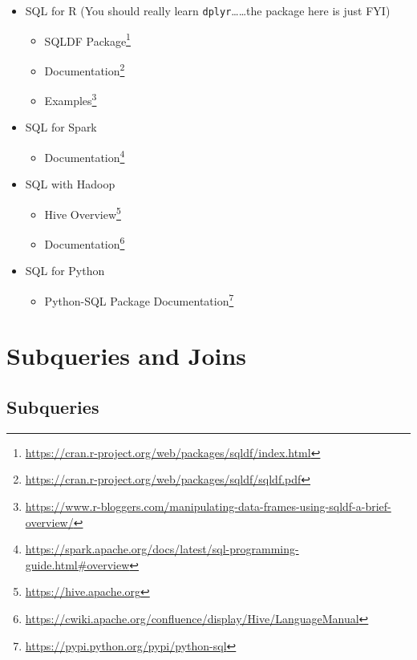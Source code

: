 \documentclass[]{book}
\providecommand{\tightlist}{%
  \setlength{\itemsep}{0pt}\setlength{\parskip}{0pt}}
\renewcommand{\href}[2]{#2\footnote{\url{#1}}}
\theoremstyle{definition}
\theoremstyle{definition}
\theoremstyle{remark}
\begin{document}
\begin{itemize}
\tightlist
\item
  SQL for R (You should really learn \texttt{dplyr}\ldots{}\ldots{}the
  package here is just FYI)

  \begin{itemize}
  \tightlist
  \item
    \href{https://cran.r-project.org/web/packages/sqldf/index.html}{SQLDF
    Package}
  \item
    \href{https://cran.r-project.org/web/packages/sqldf/sqldf.pdf}{Documentation}
  \item
    \href{https://www.r-bloggers.com/manipulating-data-frames-using-sqldf-a-brief-overview/}{Examples}
  \end{itemize}
\item
  SQL for Spark

  \begin{itemize}
  \tightlist
  \item
    \href{https://spark.apache.org/docs/latest/sql-programming-guide.html\#overview}{Documentation}
  \end{itemize}
\item
  SQL with Hadoop

  \begin{itemize}
  \tightlist
  \item
    \href{https://hive.apache.org}{Hive Overview}
  \item
    \href{https://cwiki.apache.org/confluence/display/Hive/LanguageManual}{Documentation}
  \end{itemize}
\item
  SQL for Python

  \begin{itemize}
  \tightlist
  \item
    \href{https://pypi.python.org/pypi/python-sql}{Python-SQL Package
    Documentation}
  \end{itemize}
\end{itemize}

\chapter{Subqueries and Joins}\label{subqueries-and-joins}

\section{Subqueries}\label{subqueries}
\end{document}
